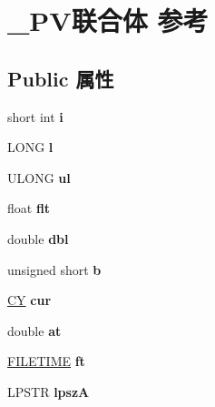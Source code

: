 \hypertarget{union___p_v}{}\section{\+\_\+\+P\+V联合体 参考}
\label{union___p_v}
\subsection*{Public 属性}
\begin{DoxyCompactItemize}
\item 
\mbox{\label{union___p_v_a929068948463af2d2daa9172abc5331b}} 
short int {\bfseries i}
\item 
\mbox{\label{union___p_v_a403e09a3fb878f82238607cc7999cb95}} 
L\+O\+NG {\bfseries l}
\item 
\mbox{\label{union___p_v_aa7686e159c434660fbc51ca797ed4d17}} 
U\+L\+O\+NG {\bfseries ul}
\item 
\mbox{\label{union___p_v_abcc8723b23bce0d27eb231d0d36f71e9}} 
float {\bfseries flt}
\item 
\mbox{\label{union___p_v_afb888d992b158a8ea53ed197e1ff4feb}} 
double {\bfseries dbl}
\item 
\mbox{\label{union___p_v_a6dd41fc7f7b5dedc10a8822037225f45}} 
unsigned short {\bfseries b}
\item 
\mbox{\label{union___p_v_a9ea187afc052e44f89dbdb240ff3c9ab}} 
\hyperlink{uniontag_c_y}{CY} {\bfseries cur}
\item 
\mbox{\label{union___p_v_afacaa13117aca88f4ffb13023e5caef3}} 
double {\bfseries at}
\item 
\mbox{\label{union___p_v_ae7de0c927385117911c6b4a05d393759}} 
\hyperlink{struct___f_i_l_e_t_i_m_e}{F\+I\+L\+E\+T\+I\+ME} {\bfseries ft}
\item 
\mbox{\label{union___p_v_ae2d4b4a8340fa7761e5002d623bb5f2d}} 
L\+P\+S\+TR {\bfseries lpszA}
\item 
\mbox{\label{union___p_v_a905fdecc230a486fdf82ffdda580de94}} 

\end{DoxyCompactItemize}
